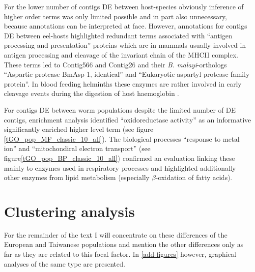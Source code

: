 For the lower number of contigs DE between host-species obviously
inference of higher order terms was only limited possible and in part
also unnecessary, because annotations can be interpreted at
face. However, annotations for contigs DE between eel-hosts
highlighted redundant terms associated with ``antigen processing and
presentation'' proteins which are in mammals usually involved in
antigen processing and cleavage of the invariant chain of the MHCII
complex. These terms led to Contig566 and Contig26 and their
\textit{B. malayi}-orthologs ``Aspartic protease BmAsp-1, identical''
and ``Eukaryotic aspartyl protease family protein''. In blood feeding
helminths these enzymes are rather involved in early cleavage events
during the digestion of host haemoglobin \cite{pmid12782060}.



For contigs DE between worm populations despite the limited number of
DE contigs, enrichment analysis identified ``oxidoreductase activity''
as an informative significantly enriched higher level term (see figure
\ref{tGO_pop_MF_classic_10_all}). The biological processes ``response
to metal ion'' and ``mitochondiral electron transport'' (see
figure\ref{tGO_pop_BP_classic_10_all}) confirmed an evaluation linking
these mainly to enzymes used in respiratory processes and highlighted
additionally other enzymes from lipid metabolism (especially
$\beta$-oxidation of fatty acids).

\section{Clustering analysis}

For the remainder of the text I will concentrate on these differences
of the European and Taiwanese populations and mention the other
differences only as far as they are related to this focal factor. In
\ref{add-figures} however, graphical analyses of the same type are
presented.

